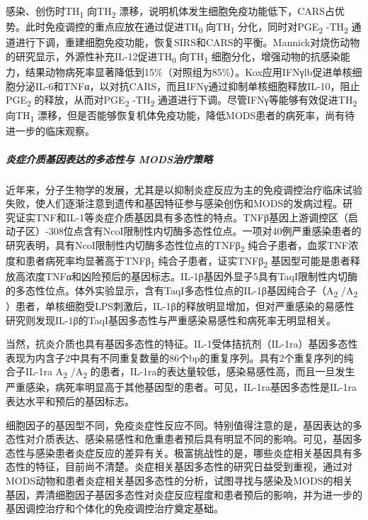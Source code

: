 感染、创伤时TH\textsubscript{1} 向TH\textsubscript{2}
漂移，说明机体发生细胞免疫功能低下，CARS占优势。此时免疫调控的重点应放在通过促进TH\textsubscript{0}
向TH\textsubscript{1} 分化，同时对PGE\textsubscript{2}
-TH\textsubscript{2}
通道进行下调，重建细胞免疫功能，恢复SIRS和CARS的平衡。Mannick对烧伤动物的研究显示，外源性补充IL-12促进TH\textsubscript{0}
向TH\textsubscript{1}
细胞分化，增强动物的抗感染能力，结果动物病死率显著降低到15\%（对照组为85\%）。Kox应用IFNγlb促进单核细胞分泌IL-6和TNFα，以对抗CARS，而且IFNγ通过抑制单核细胞释放IL-10，阻止PGE\textsubscript{2}
的释放，从而对PGE\textsubscript{2} -TH\textsubscript{2}
通道进行下调。尽管IFNγ等能够有效促进TH\textsubscript{2}
向TH\textsubscript{1}
漂移，但是否能够恢复机体免疫功能，降低MODS患者的病死率，尚有待进一步的临床观察。

\subparagraph{炎症介质基因表达的多态性与 MODS治疗策略}

近年来，分子生物学的发展，尤其是以抑制炎症反应为主的免疫调控治疗临床试验失败，使人们逐渐注意到遗传和基因特征参与感染创伤和MODS的发病过程。研究证实TNF和IL-1等炎症介质基因具有多态性的特点。TNFβ基因上游调控区（启动子区）-308位点含有NcoI限制性内切酶多态性位点。一项对40例严重感染患者的研究表明，具有NcoI限制性内切酶多态性位点的TNFβ\textsubscript{2}
纯合子患者，血浆TNF浓度和患者病死率均显著高于TNFβ\textsubscript{1}
纯合子患者，证实TNFβ\textsubscript{2}
基因型可能是患者释放高浓度TNFα和凶险预后的基因标志。IL-1β基因外显子5具有TaqI限制性内切酶的多态性位点。体外实验显示，含有TaqI多态性位点的IL-1β基因纯合子（A\textsubscript{2}
/A\textsubscript{2}
）患者，单核细胞受LPS刺激后，IL-1β的释放明显增加，但对严重感染的易感性研究则发现IL-1β的TaqI基因多态性与严重感染易感性和病死率无明显相关。

当然，抗炎介质也具有基因多态性的特征。IL-1受体拮抗剂（IL-1ra）基因多态性表现为内含子2中具有不同重复数量的86个bp的重复序列。具有2个重复序列的纯合子IL-1ra
A\textsubscript{2} /A\textsubscript{2}
的患者，IL-1ra的表达量较低，感染易感性高，而且一旦发生严重感染，病死率明显高于其他基因型的患者。可见，IL-1ra基因多态性是IL-1ra表达水平和预后的基因标志。

细胞因子的基因型不同，免疫炎症性反应不同。特别值得注意的是，基因表达的多态性对介质表达、感染易感性和危重患者预后具有明显不同的影响。可见，基因多态性与感染患者炎症反应的差异有关。极富挑战性的是，哪些炎症相关基因具有多态性的特征，目前尚不清楚。炎症相关基因多态性的研究日益受到重视，通过对MODS动物和患者炎症相关基因多态性的分析，试图寻找与感染及MODS的相关基因，弄清细胞因子基因多态性对炎症反应程度和患者预后的影响，并为进一步的基因调控治疗和个体化的免疫调控治疗奠定基础。

